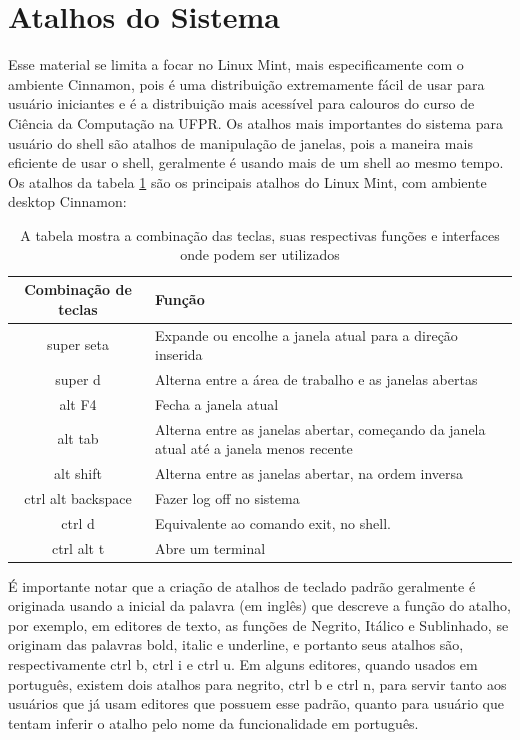 \documentclass[oneside, 11 pt]{article}
\begin{document}
	\section{Atalhos do Sistema}
	Esse material se limita a focar no Linux Mint, mais especificamente com o ambiente Cinnamon, pois é uma distribuição extremamente fácil de usar para usuário iniciantes e é a distribuição mais acessível para calouros do curso de Ciência da Computação na UFPR. Os atalhos mais importantes do sistema para usuário do shell são atalhos de manipulação de janelas, pois a maneira mais eficiente de usar o shell, geralmente é usando mais de um shell ao mesmo tempo. Os atalhos da tabela \ref{table:1} são os principais atalhos do Linux Mint, com ambiente desktop Cinnamon:
	
	\pagebreak
	
	\begin{table}
		\centering
		\begin{tabular}{|c|p{10.0cm}|}
			\hline
			\bfseries Combinação de teclas & \bfseries Função \\ \hline
			super seta & Expande ou encolhe a janela atual para a direção inserida \\ \hline
			super d & Alterna entre a área de trabalho e as janelas abertas \\ \hline
			alt F4 & Fecha a janela atual \\ \hline
			alt tab & Alterna entre as janelas abertar, começando da janela atual até a janela menos recente\\ \hline
			alt shift & Alterna entre as janelas abertar, na ordem inversa\\ \hline
			ctrl alt backspace & Fazer log off no sistema \\ \hline
			ctrl d & Equivalente ao comando exit, no shell. \\ \hline
			ctrl alt t & Abre um terminal \\ \hline
		\end{tabular}
		\caption{A tabela mostra a combinação das teclas, suas respectivas funções e interfaces onde podem ser utilizados}
		\label{table:1}
	\end{table}
	
	É importante notar que a criação de atalhos de teclado padrão geralmente é originada usando a inicial da palavra (em inglês) que descreve a função do atalho, por exemplo, em editores de texto, as funções de Negrito, Itálico e Sublinhado, se originam das palavras bold, italic e underline, e portanto seus atalhos são, respectivamente ctrl b, ctrl i e ctrl u. Em alguns editores, quando usados em português, existem dois atalhos para negrito, ctrl b e ctrl n, para servir tanto aos usuários que já usam editores que possuem esse padrão, quanto para usuário que tentam inferir o atalho pelo nome da funcionalidade em português.
	
\end{document}
